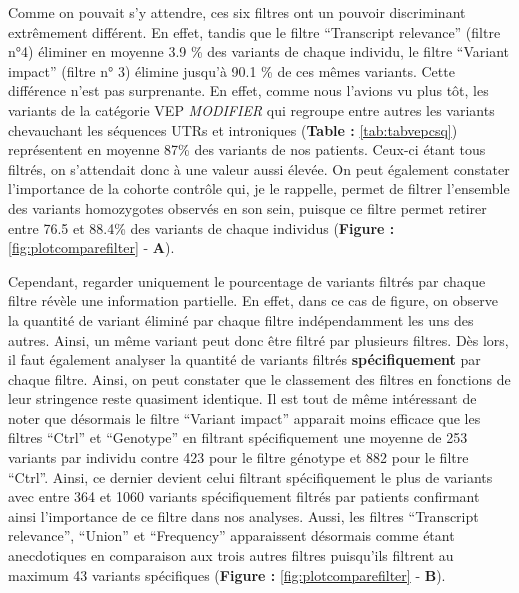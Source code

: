 \documentclass[12pt,twoside]{reedthesis}
\theoremstyle{definition}
\theoremstyle{definition}
\theoremstyle{remark}
\begin{document}
  \newpage
  
  \newpage
  
  Comme on pouvait s'y attendre, ces six filtres ont un pouvoir
  discriminant extrêmement différent. En effet, tandis que le filtre
  ``Transcript relevance'' (filtre n°4) éliminer en moyenne 3.9 \% des
  variants de chaque individu, le filtre ``Variant impact'' (filtre n° 3)
  élimine jusqu'à 90.1 \% de ces mêmes variants. Cette différence n'est
  pas surprenante. En effet, comme nous l'avions vu plus tôt, les variants
  de la catégorie VEP \emph{MODIFIER} qui regroupe entre autres les
  variants chevauchant les séquences UTRs et introniques (\textbf{Table :}
  \ref{tab:tabvepcsq}) représentent en moyenne 87\% des variants de nos
  patients. Ceux-ci étant tous filtrés, on s'attendait donc à une valeur
  aussi élevée. On peut également constater l'importance de la cohorte
  contrôle qui, je le rappelle, permet de filtrer l'ensemble des variants
  homozygotes observés en son sein, puisque ce filtre permet retirer entre
  76.5 et 88.4\% des variants de chaque individus (\textbf{Figure :}
  \ref{fig:plotcomparefilter} - \textbf{A}).
  
  Cependant, regarder uniquement le pourcentage de variants filtrés par
  chaque filtre révèle une information partielle. En effet, dans ce cas de
  figure, on observe la quantité de variant éliminé par chaque filtre
  indépendamment les uns des autres. Ainsi, un même variant peut donc être
  filtré par plusieurs filtres. Dès lors, il faut également analyser la
  quantité de variants filtrés \textbf{spécifiquement} par chaque filtre.
  Ainsi, on peut constater que le classement des filtres en fonctions de
  leur stringence reste quasiment identique. Il est tout de même
  intéressant de noter que désormais le filtre ``Variant impact'' apparait
  moins efficace que les filtres ``Ctrl'' et ``Genotype'' en filtrant
  spécifiquement une moyenne de 253 variants par individu contre 423 pour
  le filtre génotype et 882 pour le filtre ``Ctrl''. Ainsi, ce dernier
  devient celui filtrant spécifiquement le plus de variants avec entre 364
  et 1060 variants spécifiquement filtrés par patients confirmant ainsi
  l'importance de ce filtre dans nos analyses. Aussi, les filtres
  ``Transcript relevance'', ``Union'' et ``Frequency'' apparaissent
  désormais comme étant anecdotiques en comparaison aux trois autres
  filtres puisqu'ils filtrent au maximum 43 variants spécifiques
  (\textbf{Figure :} \ref{fig:plotcomparefilter} - \textbf{B}).
  
  \newpage
  
\end{document}
